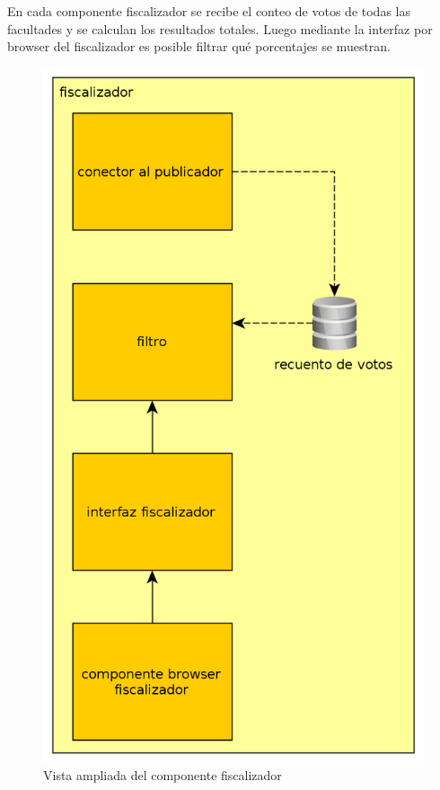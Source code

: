 En cada componente fiscalizador se recibe el conteo de votos de todas las facultades y se calculan los resultados totales. Luego mediante la interfaz por browser del fiscalizador es posible filtrar qué porcentajes se muestran.

\begin{figure}[H]
	\begin{center}
		\includegraphics[scale=0.26]{../diagramas/fiscalizador.png}
		\caption{Vista ampliada del componente fiscalizador}
	\end{center} 
\end{figure} 

